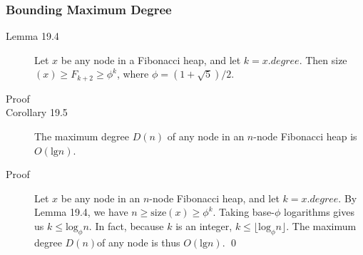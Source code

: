 \subsubsection{Bounding Maximum Degree}
\begin{description}




  \item[Lemma 19.4] Let $x$ be any node in a Fibonacci heap, and let $k =
    x.degree$. Then size$(x) \geq F_{k+2} \geq \phi^k$, where $\phi =
    (1+\sqrt{5})/2$.
  \item[Proof]

  \item[Corollary 19.5] The maximum degree $D(n)$ of any node in an $n$-node
    Fibonacci heap is $O(\text{lg} n)$.
  \item[Proof] Let $x$ be any node in an $n$-node Fibonacci heap, and let $k =
    x.degree$. By Lemma 19.4, we have $n \geq \text{size}(x) \geq
    \phi^k$. Taking base-$\phi$ logarithms gives us $k \leq \text{log}_\phi n$.
    In fact, because $k$ is an integer, $k \leq \lfloor \text{log}_\phi n
    \rfloor$. The maximum degree $D(n)$of any node is thus $O(\text{lg}
    n)$. \qed

\end{description}


